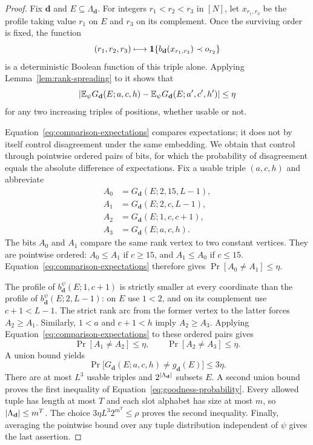 \begin{proof}
Fix $\mathbf d$ and $E\subseteq\Lambda_{\mathbf d}$.  For integers
$r_1<r_2<r_3$ in $[N]$, let $x_{r_1,r_3}$ be the profile taking value
$r_1$ on $E$ and $r_3$ on its complement.  Once the surviving order is
fixed, the function
\[
  (r_1,r_2,r_3)\longmapsto
    \mathbf 1\{b_{\mathbf d}(x_{r_1,r_3})\prec o_{r_2}\}
\]
is a deterministic Boolean function of this triple alone.  Applying
Lemma~\ref{lem:rank-spreading} to it shows that
\begin{equation}
\label{eq:comparison-expectations}
  \lvert\mathbb E_{\psi}G_{\mathbf d}(E;a,c,h)
       -\mathbb E_{\psi}G_{\mathbf d}(E;a',c',h')\rvert\le\eta
\end{equation}
for any two increasing triples of positions, whether usable or not.

Equation~\eqref{eq:comparison-expectations} compares expectations; it does
not by itself control disagreement under the same embedding.  We obtain
that control through pointwise ordered pairs of bits, for which the
probability of disagreement equals the absolute difference of expectations.
Fix a usable triple $(a,c,h)$ and abbreviate
\[
\begin{split}
  A_0&=G_{\mathbf d}(E;2,15,L-1),\\
  A_1&=G_{\mathbf d}(E;2,c,L-1),\\
  A_2&=G_{\mathbf d}(E;1,c,c+1),\\
  A_3&=G_{\mathbf d}(E;a,c,h).
\end{split}
\]
The bits $A_0$ and $A_1$ compare the same rank vertex to two constant
vertices.  They are pointwise ordered: $A_0\le A_1$ if $c\ge15$, and
$A_1\le A_0$ if $c\le15$.  Equation~\eqref{eq:comparison-expectations}
therefore gives $\Pr[A_0\ne A_1]\le\eta$.

The profile of $b_{\mathbf d}^{\psi}(E;1,c+1)$ is strictly smaller at
every coordinate than the profile of
$b_{\mathbf d}^{\psi}(E;2,L-1)$: on $E$ use $1<2$, and on its
complement use $c+1<L-1$.  The strict rank arc from the former vertex to
the latter forces $A_2\ge A_1$.  Similarly, $1<a$ and $c+1<h$ imply
$A_2\ge A_3$.  Applying Equation~\eqref{eq:comparison-expectations}
to these ordered pairs gives
\[
  \Pr[A_1\ne A_2]\le\eta,
  \qquad \Pr[A_2\ne A_3]\le\eta.
\]
A union bound yields
\[
  \Pr\bigl[G_{\mathbf d}(E;a,c,h)\ne g_{\mathbf d}(E)\bigr]
  \le3\eta.
\]
There are at most $L^3$ usable triples and
$2^{\lvert\Lambda_{\mathbf d}\rvert}$ subsets $E$.  A second union bound proves
the first inequality of Equation~\eqref{eq:goodness-probability}.
Every allowed tuple has length at most $T$ and each slot alphabet has
size at most $m$, so $\lvert\Lambda_{\mathbf d}\rvert\le m^T$.  The choice
$3\eta L^3 2^{m^T}\le\rho$ proves the second inequality.  Finally,
averaging the pointwise bound over any tuple distribution independent of
$\psi$ gives the last assertion.
\end{proof}

